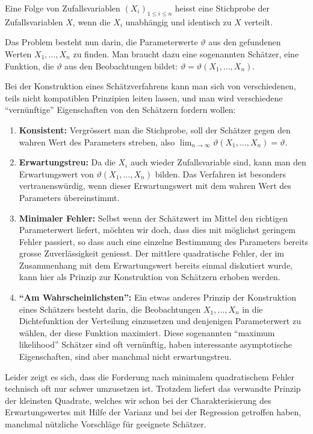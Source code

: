 \begin{definition}
Eine Folge von Zufallsvariablen $(X_i)_{1\le i\le n}$ heisst eine
Stichprobe der Zufallsvariablen $X$, wenn die $X_i$ unabhängig 
und identisch zu $X$ verteilt.
\end{definition}
Das Problem besteht nun darin, die Parameterwerte $\vartheta$
aus den gefundenen Werten $X_1,\dots,X_n$ zu finden.
Man braucht dazu
eine sogenannten Schätzer, eine Funktion, die $\vartheta$ aus den
Beobachtungen bildet: $\vartheta=\vartheta(X_1,\dots,X_n)$.

Bei der Konstruktion eines Schätzverfahrens kann man sich von verschiedenen,
teils nicht kompatiblen Prinzipien leiten lassen, und man wird verschiedene
``vernünftige'' Eigenschaften von den Schätzern fordern wollen:
\begin{enumerate}
\item {\bf Konsistent:} Vergrössert man die Stichprobe, soll der
Schätzer gegen den wahren Wert des Parameters streben, also
$\lim_{n\to\infty}\vartheta(X_1,\dots,X_n)=\vartheta$.
\item {\bf Erwartungstreu:} Da die $X_i$ auch wieder Zufallsvariable sind,
kann man den Erwartungswert von $\vartheta(X_1,\dots,X_n)$ bilden. 
Das Verfahren ist besonders vertrauenswürdig, wenn dieser Erwartungswert
mit dem wahren Wert des Parameters übereinstimmt.
\item {\bf Minimaler Fehler:} Selbst wenn der Schätzwert im Mittel den
richtigen Parameterwert liefert, möchten wir doch, dass dies mit möglichst
geringem Fehler passiert, so dass auch eine einzelne Bestimmung des
Parameters bereits grosse Zuverlässigkeit geniesst.
Der mittlere
quadratische Fehler, der im Zusammenhang mit dem Erwartungswert bereits
einmal diskutiert wurde, kann hier als Prinzip zur Konstruktion von
Schätzern erhoben werden.
\item {\bf ``Am Wahrscheinlichsten'':} Ein etwas anderes Prinzip der 
Konstruktion eines Schätzers besteht darin, die Beobachtungen $X_1,\dots,X_n$
in die Dichtefunktion der Verteilung einzusetzen und denjenigen Parameterwert
zu wählen, der diese Funktion maximiert.
Diese sogenannten
``maximum likelihood'' Schätzer sind oft vernünftig, haben interessante
asymptotische Eigenschaften, sind aber manchmal nicht erwartungstreu.
\end{enumerate}

Leider zeigt es sich, dass die Forderung nach minimalem quadratischem
Fehler technisch oft nur schwer umzusetzen ist.
Trotzdem liefert das verwandte
Prinzip der kleinsten Quadrate, welches wir schon bei der Charakterisierung
des Erwartungswertes mit Hilfe der Varianz und bei der Regression 
getroffen haben, manchmal nützliche Vorschläge für geeignete
Schätzer.

